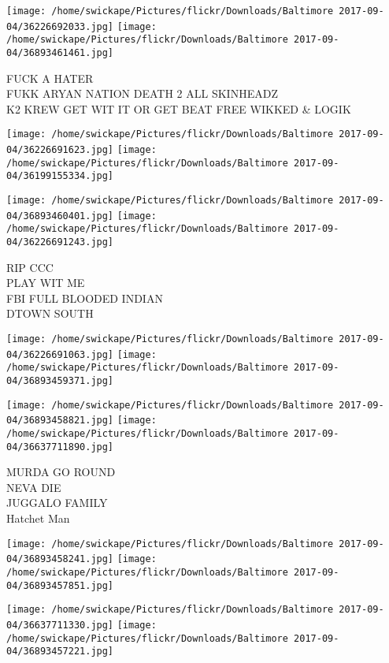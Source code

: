 \documentclass[10pt,letterpaper]{article}
\begin{document}
\vspace{0.25in}
\texttt{[image: /home/swickape/Pictures/flickr/Downloads/Baltimore 2017-09-04/36226692033.jpg]}
\texttt{[image: /home/swickape/Pictures/flickr/Downloads/Baltimore 2017-09-04/36893461461.jpg]}

FUCK A HATER\\
FUKK ARYAN NATION DEATH 2 ALL SKINHEADZ\\
K2 KREW GET WIT IT OR GET BEAT FREE WIKKED \& LOGIK\\
\pagebreak

\texttt{[image: /home/swickape/Pictures/flickr/Downloads/Baltimore 2017-09-04/36226691623.jpg]}
\texttt{[image: /home/swickape/Pictures/flickr/Downloads/Baltimore 2017-09-04/36199155334.jpg]}

\texttt{[image: /home/swickape/Pictures/flickr/Downloads/Baltimore 2017-09-04/36893460401.jpg]}
\texttt{[image: /home/swickape/Pictures/flickr/Downloads/Baltimore 2017-09-04/36226691243.jpg]}

RIP CCC\\
PLAY WIT ME\\
FBI FULL BLOODED INDIAN\\
DTOWN SOUTH\\
\pagebreak

\texttt{[image: /home/swickape/Pictures/flickr/Downloads/Baltimore 2017-09-04/36226691063.jpg]}
\texttt{[image: /home/swickape/Pictures/flickr/Downloads/Baltimore 2017-09-04/36893459371.jpg]}

\texttt{[image: /home/swickape/Pictures/flickr/Downloads/Baltimore 2017-09-04/36893458821.jpg]}
\texttt{[image: /home/swickape/Pictures/flickr/Downloads/Baltimore 2017-09-04/36637711890.jpg]}

MURDA GO ROUND\\
NEVA DIE\\
JUGGALO FAMILY\\
Hatchet Man\\
\pagebreak

\texttt{[image: /home/swickape/Pictures/flickr/Downloads/Baltimore 2017-09-04/36893458241.jpg]}
\texttt{[image: /home/swickape/Pictures/flickr/Downloads/Baltimore 2017-09-04/36893457851.jpg]}

\texttt{[image: /home/swickape/Pictures/flickr/Downloads/Baltimore 2017-09-04/36637711330.jpg]}
\texttt{[image: /home/swickape/Pictures/flickr/Downloads/Baltimore 2017-09-04/36893457221.jpg]}
\end{document}
